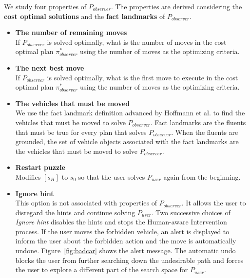 We study four properties of $P_{observer}$. The properties are derived considering the \textbf{cost optimal solutions} and the \textbf{fact landmarks} of $P_{observer}$.
\begin{itemize}
\item \textbf{The number of remaining moves}\\ If $P_{observer}$ is solved optimally, what is the number of moves in the cost optimal plan $\pi^{*}_{observer}$ using the number of moves as the optimizing criteria.
\item \textbf{The next best move}\\ If $P_{observer}$ is solved optimally, what is the first move to execute in the cost optimal plan $\pi^{*}_{observer}$ using the number of moves as the optimizing criteria.
\item \textbf{The vehicles that must be moved} \\
We use the fact landmark definition advanced by Hoffmann et al. \citeyear{hoffman2004lm} to find the vehicles that must be moved to solve $P_{observer}$.
Fact landmarks are the fluents that must be true for every plan that solves $P_{observer}$. 
When the fluents are grounded, the set of vehicle objects associated with the fact landmarks are the vehicles that must be moved to solve $P_{observer}$.
\item \textbf{Restart puzzle}\\
Modifies $[s_H]$ to $s_0$ so that the user solves $P_{user}$ again from the beginning.
\item \textbf{Ignore hint} \\This option is not associated with properties of $P_{observer}$.
It allows the user to disregard the hints and continue solving $P_{user}$. 
Two successive choices of \textit{Ignore hint} disables the hints and stops the Human-aware Intervention process.
If the user moves the forbidden vehicle, an alert is displayed to inform the user about the forbidden action and the move is automatically undone. Figure~\ref{fig:badcar} shows the alert message.
The automatic undo blocks the user from further searching down the undesirable path and forces the user to explore a different part of the search space for $P_{user}$.
\end{itemize}

